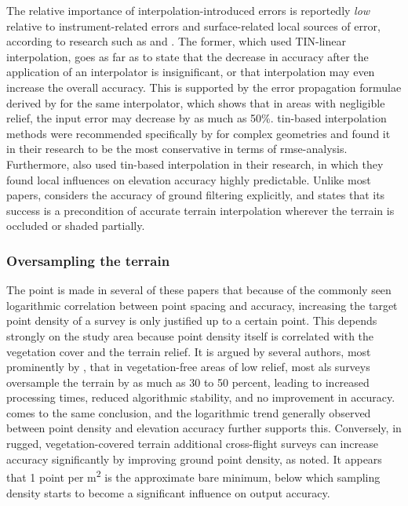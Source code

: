 The relative importance of interpolation-introduced errors is reportedly \textit{low} relative to instrument-related errors and surface-related local sources of error, according to research such as \cite{hodgson_breshanan_2004} and \cite{aguilar_etal_2010}. The former, which used TIN-linear interpolation, goes as far as to state that the decrease in accuracy after the application of an interpolator is insignificant, or that interpolation may even increase the overall accuracy. This is supported by the error propagation formulae derived by \cite{fan_etal_2014} for the same interpolator, which shows that in areas with negligible relief, the input error may decrease by as much as 50\%. \ac{tin}-based interpolation methods were recommended specifically by \cite{bater_coops_2009} for complex geometries and found it in their research to be the most conservative in terms of \ac{rmse}-analysis. Furthermore, \cite{peng_shih_2006} also used \ac{tin}-based interpolation in their research, in which they found local influences on elevation accuracy highly predictable. Unlike most papers, \cite{aguilar_etal_2010} considers the accuracy of ground filtering explicitly, and states that its success is a precondition of accurate terrain interpolation wherever the terrain is occluded or shaded partially.

\subsubsection{Oversampling the terrain}

The point is made in several of these papers that because of the commonly seen logarithmic correlation between point spacing and accuracy, increasing the target point density of a survey is only justified up to a certain point. This depends strongly on the study area because point density itself is correlated with the vegetation cover and the terrain relief. It is argued by several authors, most prominently by \cite{guo_etal_2010}, that in vegetation-free areas of low relief, most \ac{als} surveys oversample the terrain by as much as 30 to 50 percent, leading to increased processing times, reduced algorithmic stability, and no improvement in accuracy. \cite{bater_coops_2009} comes to the same conclusion, and the logarithmic trend generally observed between point density and elevation accuracy further supports this. Conversely, in rugged, vegetation-covered terrain additional cross-flight surveys can increase accuracy significantly by improving ground point density, as \cite{peng_shih_2006} noted. It appears that 1 point per m\textsuperscript{2} is the approximate bare minimum, below which sampling density starts to become a significant influence on output accuracy.

